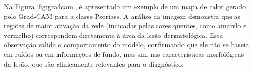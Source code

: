 Na Figura \ref{fig:gradcam}, é apresentado um exemplo de um mapa de calor gerado pelo Grad-CAM para a classe Psoríase. A análise da imagem demonstra que as regiões de maior ativação da rede (indicadas pelas cores quentes, como amarelo e vermelho) correspondem diretamente à área da lesão dermatológica. Essa observação valida o comportamento do modelo, confirmando que ele não se baseia em ruídos ou em informações de fundo, mas sim nas características morfológicas da lesão, que são clinicamente relevantes para o diagnóstico.



